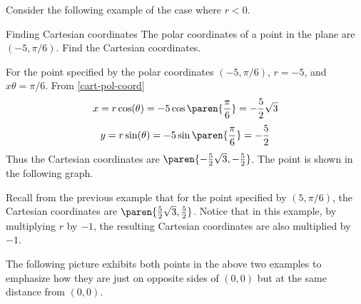 Consider the following example of the case where $r < 0$.

\begin{example}{Finding Cartesian coordinates}{}
The polar coordinates of a point in the plane are $(-5,\pi /6)$.
Find the Cartesian coordinates.
\end{example}

\begin{solution}
For the point specified by the polar coordinates $(-5, \pi /6)$,
$r=-5$, and $x\theta = \pi /6$.
From {\eqref{cart-pol-coord}}
\[
x= r \cos (\theta)= -5\cos \paren{\vspace{0.05in}\frac{\pi }{6}} = -\vspace{0.05in}\frac{5}{2}\sqrt{3}
\]
\[
y= r \sin (\theta) = -5\sin \paren{\vspace{0.05in}\frac{\pi }{6}} = -\vspace{0.05in}\frac{5}{2}
\]
Thus the Cartesian coordinates are $\paren{-\vspace{0.05in}\frac{5}{2}\sqrt{3}, -\vspace{0.05in}\frac{5}{2}}$. The point is shown in the following graph.

\begin{center}
\end{center}

Recall from the previous example that for the point specified by $(5, \pi /6)$, the Cartesian coordinates are $\paren{\vspace{0.05in}\frac{5}{2}\sqrt{3}, \vspace{0.05in}\frac{5}{2}}$. Notice that in this example, by multiplying $r$ by $-1$, the resulting Cartesian coordinates are also multiplied by $-1$.
\end{solution}

The following picture exhibits both points in the above two examples to
emphasize how they are just on opposite sides of $(0,0) $ but at
the same distance from $(0,0)$.

\begin{center}
\end{center}

